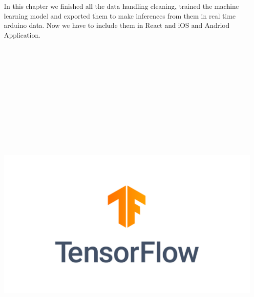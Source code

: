 In this chapter we finished all the data handling cleaning, trained the machine learning model and exported them to make inferences from them in real time arduino data. Now we have to include them in React and iOS and Andriod Application.\\
\\
\\
\\
\\
\\
\\
\\

\\
\\
\\
\\
\\

\includegraphics[width=1\textwidth]{images/tensorflow.png}\\